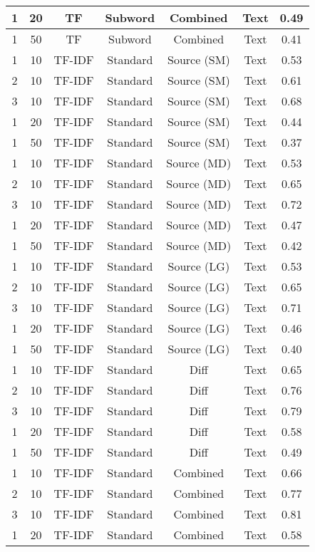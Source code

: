 \begin{longtable}{|c|c|c|c|c|c|c|}
\hline
1 & 20 & TF & Subword & Combined & Text & 0.49 \\
\hline
1 & 50 & TF & Subword & Combined & Text & 0.41 \\
\hline
1 & 10 & TF-IDF & Standard & Source (SM) & Text & 0.53 \\
\hline
2 & 10 & TF-IDF & Standard & Source (SM) & Text & 0.61 \\
\hline
3 & 10 & TF-IDF & Standard & Source (SM) & Text & 0.68 \\
\hline
1 & 20 & TF-IDF & Standard & Source (SM) & Text & 0.44 \\
\hline
1 & 50 & TF-IDF & Standard & Source (SM) & Text & 0.37 \\
\hline
1 & 10 & TF-IDF & Standard & Source (MD) & Text & 0.53 \\
\hline
2 & 10 & TF-IDF & Standard & Source (MD) & Text & 0.65 \\
\hline
3 & 10 & TF-IDF & Standard & Source (MD) & Text & 0.72 \\
\hline
1 & 20 & TF-IDF & Standard & Source (MD) & Text & 0.47 \\
\hline
1 & 50 & TF-IDF & Standard & Source (MD) & Text & 0.42 \\
\hline
1 & 10 & TF-IDF & Standard & Source (LG) & Text & 0.53 \\
\hline
2 & 10 & TF-IDF & Standard & Source (LG) & Text & 0.65 \\
\hline
3 & 10 & TF-IDF & Standard & Source (LG) & Text & 0.71 \\
\hline
1 & 20 & TF-IDF & Standard & Source (LG) & Text & 0.46 \\
\hline
1 & 50 & TF-IDF & Standard & Source (LG) & Text & 0.40 \\
\hline
1 & 10 & TF-IDF & Standard & Diff & Text & 0.65 \\
\hline
2 & 10 & TF-IDF & Standard & Diff & Text & 0.76 \\
\hline
3 & 10 & TF-IDF & Standard & Diff & Text & 0.79 \\
\hline
1 & 20 & TF-IDF & Standard & Diff & Text & 0.58 \\
\hline
1 & 50 & TF-IDF & Standard & Diff & Text & 0.49 \\
\hline
1 & 10 & TF-IDF & Standard & Combined & Text & 0.66 \\
\hline
2 & 10 & TF-IDF & Standard & Combined & Text & 0.77 \\
\hline
3 & 10 & TF-IDF & Standard & Combined & Text & 0.81 \\
\hline
1 & 20 & TF-IDF & Standard & Combined & Text & 0.58 \\

\end{longtable}
